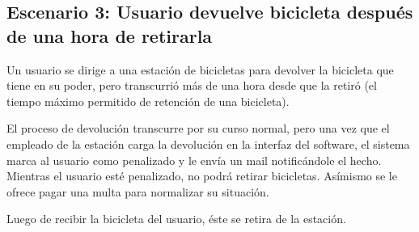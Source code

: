 \documentclass[a4paper, 10pt, twoside]{article}
\begin{document}
\subsection{Escenario 3: Usuario devuelve bicicleta después de una hora de retirarla}

Un usuario se dirige a una estación de bicicletas para devolver la bicicleta que tiene en su poder, pero transcurrió más de una hora desde que la retiró (el tiempo máximo permitido de retención de una bicicleta).

El proceso de devolución transcurre por su curso normal, pero una vez que el empleado de la estación carga la devolución en la interfaz del software, el sistema marca al usuario como penalizado y le envía un mail notificándole el hecho. Mientras el usuario esté penalizado, no podrá retirar bicicletas. Asímismo se le ofrece pagar una multa para normalizar su situación.

Luego de recibir la bicicleta del usuario, éste se retira de la estación.
\end{document}
